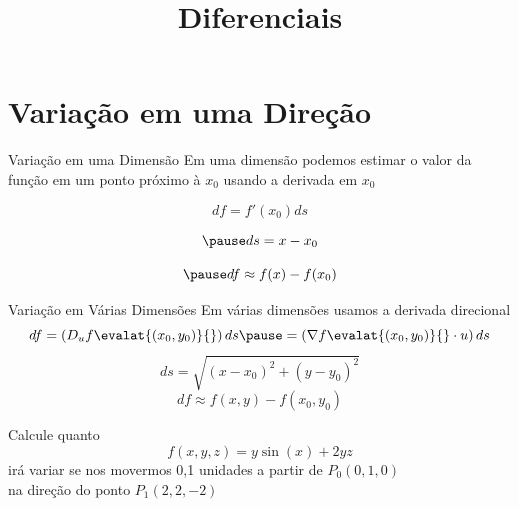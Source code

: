 
\usepackage{calculo_varias_variaveis-1}

\title{Diferenciais}



\addtitle

\section{Variação em uma Direção}

\begin{frame}{Variação em uma Dimensão}
  Em uma dimensão podemos estimar o valor da função em um ponto próximo à $x_0$
  usando a derivada em $x_0$

  \pause
  \[
  df = f'(x_0) ds
  \]

  \[
  \pause
  ds = x - x_0
  \]

  \[
  \pause
  df \approx f(x) - f(x_0)
  \]
\end{frame}

\begin{frame}{Variação em Várias Dimensões}
  Em várias dimensões usamos a derivada direcional
  \pause
  \[
  df
  = \left(D_u f\evalat{(x_0, y_0)}{}\right) ds
  \pause
  = \left(\nabla f\evalat{(x_0, y_0)}{} \cdot u\right) ds
  \]
  \pause
  \[
  ds = \sqrt{(x - x_0)^2 + (y-y_0)^2}
  \]
  \pause
  \[
  df \approx f(x, y) - f(x_0, y_0)
  \]
\end{frame}

\begin{question}
  Calcule quanto
  \[
  f(x, y, z) = y\sin(x) + 2yz
  \]
  irá variar se nos movermos 0,1 unidades a partir de \(P_0(0, 1, 0)\) \\
  na direção do ponto \(P_1(2, 2, -2)\)
\end{question}

